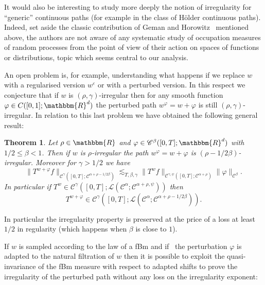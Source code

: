 \documentclass[a4paper,11pt]{article}
\newtheorem{theorem}{Theorem}[section]
\newcommand{\CC}{\mathscr C}
\begin{document}
It would also be interesting to study more deeply the notion of irregularity
for ``generic'' continuous paths (for example in the class of Hölder
continuous paths). Indeed, set aside the classic contribution of Geman and
Horowitz~{\cite{geman_occupation_1980}} mentioned above, the authors are not
aware of any systematic study of occupation measures of random processes from
the point of view of their action on spaces of functions or distributions,
topic which seems central to our analysis.



An open problem is, for example, understanding what happens if we replace $w$
with a regularised version $w^{\varepsilon}$ or with a perturbed version. In
this respect we conjecture that if $w$ is $( \rho , \gamma )$-irregular then
for any smooth function $\varphi \in C ( [ 0,1 ] ;\mathbbm{R}^{d} )$ the
perturbed path $w^{\varphi} =w+ \varphi$ is still $( \rho , \gamma
)$-irregular. In relation to this last problem we have obtained the following
general result:

\begin{theorem}
  \label{th:perturbed-young}Let $\rho \in \mathbbm{R}$ and $\varphi \in
  \CC^{\beta} ( [ 0,T ] ;\mathbbm{R}^{d} )$ with $1/2 \leqslant \beta <1$.
  Then if $w$ is $\rho$-irregular the path $w^{\varphi} =w+ \varphi$ is $(
  \rho -1/2 \beta )$-irregular. Moreover for $\gamma >1/2$ we have
  \[ \| T^{w+ \varphi}_{} f \|_{\CC^{\gamma} \left( [ 0,T ] ; \CC^{\alpha + \rho
     -1/2 \beta} \right)} \lesssim_{T, \beta , \gamma} \| T^{w} f
     \|_{\CC^{\gamma , \psi} \left( [ 0,T ] ; \CC^{\alpha + \rho} \right)} \|
     \varphi \|_{\CC^{\beta}}. \]
In particular if $T^{w} \in \CC^{\gamma} \left( [ 0,T ] ;\mathcal{L}
  \left( \CC^{\alpha} ; \CC^{\alpha + \rho , \psi} \right) \right)$ then
  $$T^{w+ \varphi} \in \CC^{\gamma} \left( [ 0,T ] ;\mathcal{L} \left(
  \CC^{\alpha} ; \CC^{\alpha + \rho -1/2 \beta} \right) \right).$$
\end{theorem}

In particular the irregularity property is preserved at the price of a loss at
least $1/2$ in regularity (which happens when $\beta$ is close to $1$).



If $w$ is sampled according to the law of a fBm and if \ the perturbation
$\varphi$ is adapted to the natural filtration of $w$ then it is possible to
exploit the quasi-invariance of the fBm measure with respect to adapted shifts to prove
the irregularity of the perturbed path without any loss on the irregularity
exponent:
\end{document}
